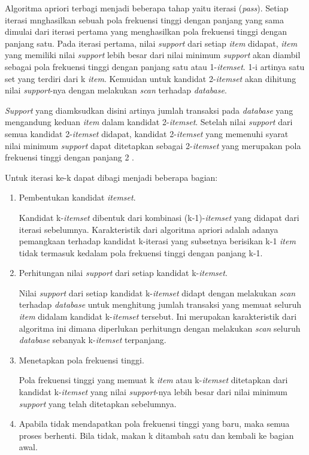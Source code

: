 \par Algoritma apriori terbagi menjadi beberapa tahap yaitu iterasi (\textit{pass}). Setiap iterasi mnghasilkan sebuah pola frekuensi tinggi dengan panjang yang sama dimulai dari iterasi pertama yang menghasilkan pola frekuensi tinggi dengan panjang satu. Pada iterasi pertama, nilai \textit{support} dari setiap \textit{item} didapat, \textit{item} yang memiliki nilai \textit{support} lebih besar dari nilai minimum \textit{support} akan diambil sebagai pola frekuensi tinggi dengan panjang satu atau 1-\textit{itemset}. 1-i artinya satu set yang terdiri dari k \textit{item}. Kemuidan untuk kandidat 2-\textit{itemset} akan dihitung nilai \textit{support}-nya dengan melakukan \textit{scan} terhadap \textit{database}.
\par
\textit{Support} yang diamksudkan disini artinya jumlah transaksi pada \textit{database} yang mengandung keduan \textit{item} dalam kandidat 2-\textit{itemset}. Setelah nilai \textit{support} dari semua kandidat 2-\textit{itemset} didapat, kandidat 2-\textit{itemset} yang memenuhi syarat nilai minimum \textit{support} dapat ditetapkan sebagai 2-\textit{itemset} yang merupakan pola frekuensi tinggi dengan panjang 2 \cite{nursikuwagus2016implementasi}.
\par
Untuk iterasi ke-k dapat dibagi menjadi beberapa bagian:
 \begin{enumerate}
\item Pembentukan kandidat \textit{itemset}.
\par Kandidat k-\textit{itemset} dibentuk dari kombinasi (k-1)-\textit{itemset} yang didapat dari iterasi sebelumnya. Karakteristik dari algoritma apriori adalah adanya pemangkaan terhadap kandidat k-iterasi yang subsetnya berisikan k-1 \textit{item} tidak termasuk kedalam pola frekuensi tinggi dengan panjang k-1.
\item Perhitungan nilai \textit{support} dari setiap kandidat k-\textit{itemset}.
\par Nilai \textit{support} dari setiap kandidat k-\textit{itemset} didapt dengan melakukan \textit{scan} terhadap \textit{database} untuk menghitung jumlah transaksi yang memuat seluruh \textit{item} didalam kandidat k-\textit{itemset} tersebut. Ini merupakan karakteristik dari algoritma ini dimana diperlukan perhitungn dengan melakukan \textit{scan} seluruh \textit{database} sebanyak k-\textit{itemset} terpanjang.
\item Menetapkan pola frekuensi tinggi.

\par 
Pola frekuensi tinggi yang memuat k \textit{item} atau k-\textit{itemset} ditetapkan dari kandidat k-\textit{itemset} yang nilai \textit{support}-nya lebih besar dari nilai minimum \textit{support} yang telah ditetapkan sebelumnya.
\item Apabila tidak mendapatkan pola frekuensi tinggi yang baru, maka semua proses berhenti. Bila tidak, makan k ditambah satu dan kembali ke bagian awal.
\end{enumerate}

